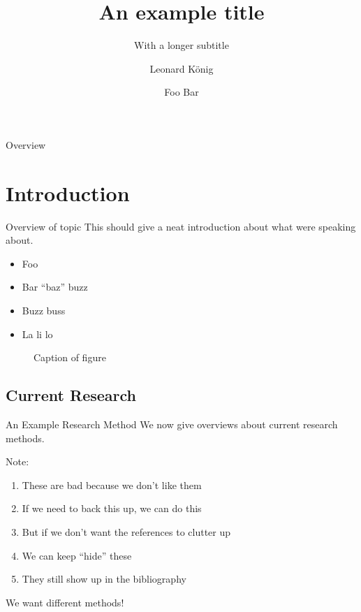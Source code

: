 \documentclass[aspectratio=169,hyperref={pdfusetitle,pdfencoding=auto}]{beamer}
\title{An example title}
\subtitle{With a longer subtitle}
\institute{Institute for Silly Walks}
\author{Leonard König\and Foo Bar}
\begin{document}

\begin{frame}
  \titlepage
\end{frame}

\begin{frame}{Overview}
  \tableofcontents
\end{frame}


\section{Introduction}

\begin{frame}{Overview of topic}
This should give a neat introduction about what were speaking about.
\begin{itemize}
  \item Foo
  \item Bar \enquote{baz} buzz
  \item Buzz buss
  \item La li lo
\end{itemize}

\begin{figure}
\centering
{}
\caption{Caption of figure}
\end{figure}
\end{frame}


\subsection{Current Research}

\begin{frame}{An Example Research Method}
We now give overviews about current research methods.

\vfill
Note:
\begin{enumerate}
  \item These are bad because we don't like them
  \item If we need to back this up, we can do this~\cite{Author/2020}
  \item But if we don't want the references to clutter up
  \item We can keep \enquote{hide} these\nocite{Author/2020}
  \item They still show up in the bibliography
\end{enumerate}
\vfill
\pause
\alert{We want different methods!}
\end{frame}
\end{document}
